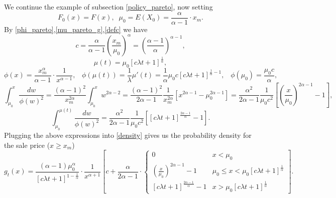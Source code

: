 \documentclass{article}
\numberwithin{equation}{section}
\begin{document}
	We continue the example of subsection \ref{policy_pareto}, now setting
	$$F_0(x)=F(x),\;\;\mu_0=E(X_0)=\frac{\alpha}{\alpha-1}\cdot x_m.$$
	By \eqref{phi_pareto},\eqref{mu_pareto_g},\eqref{defc} we have
	$$c=\frac{\alpha}{\alpha-1}\left(\frac{x_m}{\mu_0} \right)^\alpha=\left(\frac{\alpha-1}{\alpha} \right)^{\alpha-1},$$
	$$
	\mu(t)=\mu_0\left[c\lambda t+1\right]^{\frac{1}{\alpha}},$$
	\begin{equation}\label{cp}\phi(x)=\frac{x_m^\alpha}{\alpha-1}\cdot \frac{1}{x^{\alpha-1}},\;\;\;\phi(\mu(t))=\frac{1}{\lambda} \mu'(t)=\frac{1}{\alpha}\mu_0c\left[c \lambda t+1\right]^{\frac{1}{\alpha}-1},\;\;\;\phi(\mu_0)=\frac{\mu_0 c}{\alpha},\end{equation}
	$$\int_{\mu_0}^x \frac{dw}{\phi(w)^2}=\frac{(\alpha-1)^2}{x_m^{2\alpha}}\int_{\mu_0}^x w^{2\alpha-2}=\frac{(\alpha-1)^2}{2\alpha-1}\frac{1}{x_m^{2\alpha}}\left[x^{2\alpha-1}-\mu_0^{2\alpha-1} \right]=\frac{\alpha^2}{2\alpha-1}\frac{1}{\mu_0 c^2}\left[\left(\frac{x}{\mu_0}\right)^{2\alpha-1}-1 \right],$$
	$$\int_{\mu_0}^{\mu(t)} \frac{dw}{\phi(w)^2}=\frac{\alpha^2}{2\alpha-1}\frac{1}{\mu_0 c^2}\left[[c\lambda t+1]^{\frac{2\alpha-1}{\alpha}}-1 \right].$$
	Plugging the above expressions into 
	\eqref{density} gives us the probability density for the 
	sale price ($x\geq x_m$)
	\begin{equation}
		\label{pareto_den}
	g_t(x)
	=\frac{(\alpha-1) \mu_0^\alpha}{\left[c \lambda t+1\right]^{1-\frac{1}{\alpha}}}\cdot \frac{1}{x^{\alpha+1}} \left[c+\frac{\alpha}{2\alpha-1} \cdot \begin{cases}
		0 & x<\mu_0\\
		\left(\frac{x}{\mu_0}\right)^{2\alpha-1}-1  & \mu_0\leq x<\mu_0\left[c\lambda t+1\right]^{\frac{1}{\alpha}}\\
		[c\lambda t+1]^{\frac{2\alpha-1}{\alpha}}-1	& x>\mu_0\left[c\lambda t+1\right]^{\frac{1}{\alpha}}
	\end{cases}\right]
	.\end{equation}
	
\end{document}
